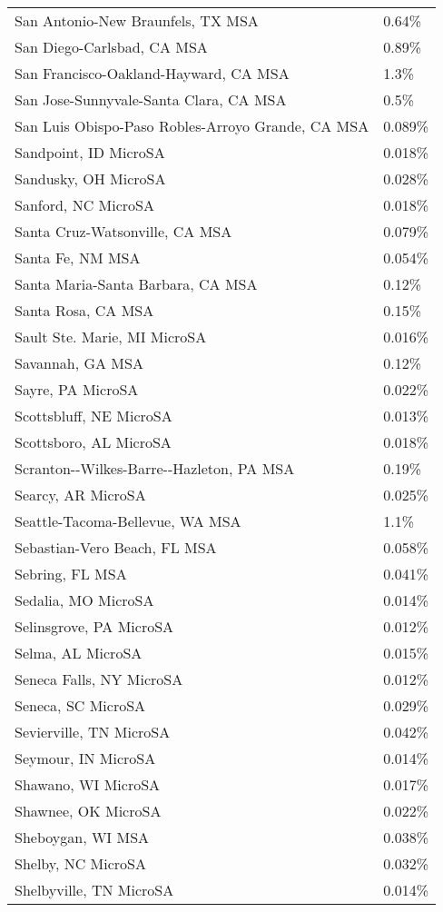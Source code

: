 \begin{longtable}[]{@{}ll@{}}
San Antonio-New Braunfels, TX MSA & 0.64\% \\
San Diego-Carlsbad, CA MSA & 0.89\% \\
San Francisco-Oakland-Hayward, CA MSA & 1.3\% \\
San Jose-Sunnyvale-Santa Clara, CA MSA & 0.5\% \\
San Luis Obispo-Paso Robles-Arroyo Grande, CA MSA & 0.089\% \\
Sandpoint, ID MicroSA & 0.018\% \\
Sandusky, OH MicroSA & 0.028\% \\
Sanford, NC MicroSA & 0.018\% \\
Santa Cruz-Watsonville, CA MSA & 0.079\% \\
Santa Fe, NM MSA & 0.054\% \\
Santa Maria-Santa Barbara, CA MSA & 0.12\% \\
Santa Rosa, CA MSA & 0.15\% \\
Sault Ste. Marie, MI MicroSA & 0.016\% \\
Savannah, GA MSA & 0.12\% \\
Sayre, PA MicroSA & 0.022\% \\
Scottsbluff, NE MicroSA & 0.013\% \\
Scottsboro, AL MicroSA & 0.018\% \\
Scranton-\/-Wilkes-Barre-\/-Hazleton, PA MSA & 0.19\% \\
Searcy, AR MicroSA & 0.025\% \\
Seattle-Tacoma-Bellevue, WA MSA & 1.1\% \\
Sebastian-Vero Beach, FL MSA & 0.058\% \\
Sebring, FL MSA & 0.041\% \\
Sedalia, MO MicroSA & 0.014\% \\
Selinsgrove, PA MicroSA & 0.012\% \\
Selma, AL MicroSA & 0.015\% \\
Seneca Falls, NY MicroSA & 0.012\% \\
Seneca, SC MicroSA & 0.029\% \\
Sevierville, TN MicroSA & 0.042\% \\
Seymour, IN MicroSA & 0.014\% \\
Shawano, WI MicroSA & 0.017\% \\
Shawnee, OK MicroSA & 0.022\% \\
Sheboygan, WI MSA & 0.038\% \\
Shelby, NC MicroSA & 0.032\% \\
Shelbyville, TN MicroSA & 0.014\% \\

\end{longtable}
